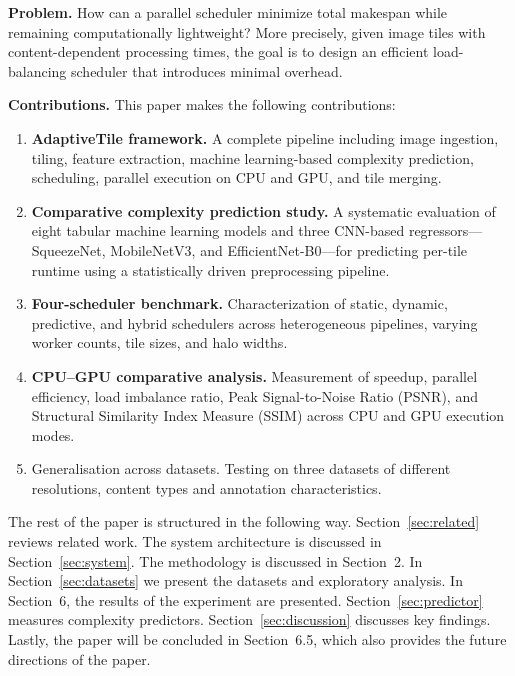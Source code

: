 \documentclass[acmsmall]{acmart}
\begin{document}
\textbf{Problem.} 
How can a parallel scheduler minimize total makespan while remaining computationally lightweight? 
More precisely, given image tiles with content-dependent processing times, the goal is to design an efficient load-balancing scheduler that introduces minimal overhead.

\textbf{Contributions.} 
This paper makes the following contributions:

\begin{enumerate}
  \item \textbf{AdaptiveTile framework.} 
  A complete pipeline including image ingestion, tiling, feature extraction, machine learning-based complexity prediction, scheduling, parallel execution on CPU and GPU, and tile merging.

  \item \textbf{Comparative complexity prediction study.} 
  A systematic evaluation of eight tabular machine learning models and three CNN-based regressors—SqueezeNet, MobileNetV3, and EfficientNet-B0—for predicting per-tile runtime using a statistically driven preprocessing pipeline.

  \item \textbf{Four-scheduler benchmark.} 
  Characterization of static, dynamic, predictive, and hybrid schedulers across heterogeneous pipelines, varying worker counts, tile sizes, and halo widths.

  \item \textbf{CPU--GPU comparative analysis.} 
  Measurement of speedup, parallel efficiency, load imbalance ratio, Peak Signal-to-Noise Ratio (PSNR), and Structural Similarity Index Measure (SSIM) across CPU and GPU execution modes.

  \item Generalisation across datasets. 
Testing on three datasets of different resolutions, content types and annotation characteristics.
\end{enumerate}

The rest of the paper is structured in the following way. 
Section~\ref{sec:related} reviews related work. 
The system architecture is discussed in Section~\ref{sec:system}. 
The methodology is discussed in Section~2. 
In Section~\ref{sec:datasets} we present the datasets and exploratory analysis. 
In Section~6, the results of the experiment are presented. 
Section~\ref{sec:predictor} measures complexity predictors. 
Section~\ref{sec:discussion} discusses key findings. 
Lastly, the paper will be concluded in Section~6.5, which also provides the future directions of the paper.
\end{document}
